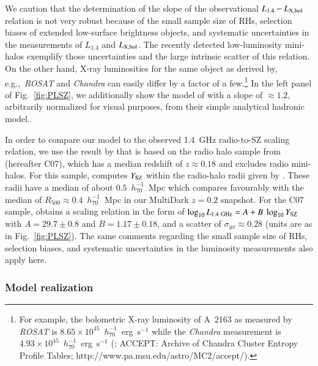 \documentclass[useAMS,usenatbib]{mn2e}
\begin{document}
We caution that the determination of the slope of the observational
$L_{1.4}-L_{{\mathrm{X,bol}}}$ relation is not very robust because of the small
sample size of RHs, selection biases of extended low-surface brightness objects,
and systematic uncertainties in the measurements of $L_{1.4}$ and
$L_{{\mathrm{X,bol}}}$. The recently detected low-luminosity mini-halos exemplify
those uncertainties and the large intrinsic scatter of this relation. On the
other hand, X-ray luminosities for the same object as derived by,
e.g.,~\emph{ROSAT} and \emph{Chandra} can easily differ by a factor of a
few.\footnote{For example, the bolometric X-ray luminosity of A~2163 as measured
  by \emph{ROSAT} is $8.65\times10^{45}$~$h_{70}^{-1}$~erg~s$^{-1}$
  \citep{2009A&A...507..661B} while the \emph{Chandra} measurement is
  $4.93\times10^{45}$~$h_{70}^{-1}$~erg~s$^{-1}$ (\citealp{2009ApJS..182...12C};
  ACCEPT: Archive of Chandra Cluster Entropy Profile Tables;
  http://www.pa.msu.edu/astro/MC2/accept/).}  In the left panel of
Fig.~\ref{fig:PLSZ}, we additionally show the model of
\citet{2009JCAP...09..024K} with a slope of $\approx1.2$, arbitrarily normalized
for visual purposes, from their simple analytical hadronic model.

In order to compare our model to the observed 1.4~GHz radio-to-SZ scaling
relation, we use the result by \cite{2012MNRAS.421L.112B} that is based on the
radio halo sample from \cite{2007MNRAS.378.1565C} (hereafter C07), which has a
median redshift of $z \approx 0.18$ and excludes radio mini-halos. For this
sample, \cite{2012MNRAS.421L.112B} computes $Y_{{\mathrm{SZ}}}$ within the radio-halo
radii given by \cite{2007MNRAS.378.1565C}. These radii have a median of about
$0.5$~$h_{70}^{-1}$~Mpc which compares favourably with the median of $R_{500}
\approx 0.4$~$h_{70}^{-1}$~Mpc in our MultiDark $z = 0.2$ snapshot. For the C07
sample, \cite{2012MNRAS.421L.112B} obtains a scaling relation in the form of
$\log_{10} L_{1.4~{\mathrm{GHz}}} = A + B~\log_{10} Y_{{\mathrm{SZ}}}$ with $A=29.7\pm0.8$
and $B=1.17\pm0.18$, and a scatter of $\sigma_{yx} \approx 0.28$ (units are as
in Fig.~\ref{fig:PLSZ}). The same comments regarding the small sample size of
RHs, selection biases, and systematic uncertainties in the luminosity
measurements also apply here.


\subsubsection{Model realization}
\end{document}
